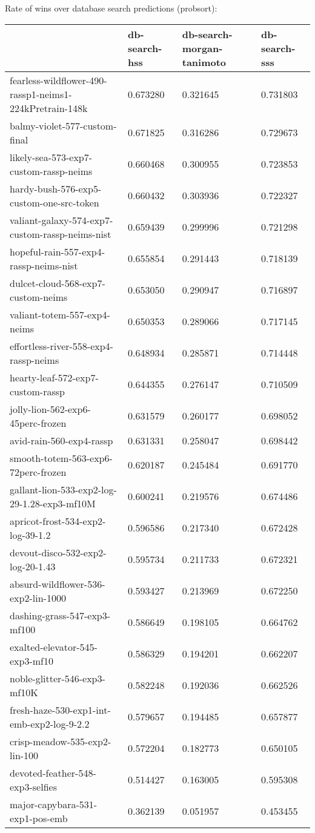 Rate of wins over database search predictions (probsort):
\begin{tabular}{llll}
\toprule
 & db-search-hss & db-search-morgan-tanimoto & db-search-sss \\
\midrule
fearless-wildflower-490-rassp1-neims1-224kPretrain-148k & 0.673280 & 0.321645 & 0.731803 \\
balmy-violet-577-custom-final & 0.671825 & 0.316286 & 0.729673 \\
likely-sea-573-exp7-custom-rassp-neims & 0.660468 & 0.300955 & 0.723853 \\
hardy-bush-576-exp5-custom-one-src-token & 0.660432 & 0.303936 & 0.722327 \\
valiant-galaxy-574-exp7-custom-rassp-neims-nist & 0.659439 & 0.299996 & 0.721298 \\
hopeful-rain-557-exp4-rassp-neims-nist & 0.655854 & 0.291443 & 0.718139 \\
dulcet-cloud-568-exp7-custom-neims & 0.653050 & 0.290947 & 0.716897 \\
valiant-totem-557-exp4-neims & 0.650353 & 0.289066 & 0.717145 \\
effortless-river-558-exp4-rassp-neims & 0.648934 & 0.285871 & 0.714448 \\
hearty-leaf-572-exp7-custom-rassp & 0.644355 & 0.276147 & 0.710509 \\
jolly-lion-562-exp6-45perc-frozen & 0.631579 & 0.260177 & 0.698052 \\
avid-rain-560-exp4-rassp & 0.631331 & 0.258047 & 0.698442 \\
smooth-totem-563-exp6-72perc-frozen & 0.620187 & 0.245484 & 0.691770 \\
gallant-lion-533-exp2-log-29-1.28-exp3-mf10M & 0.600241 & 0.219576 & 0.674486 \\
apricot-frost-534-exp2-log-39-1.2 & 0.596586 & 0.217340 & 0.672428 \\
devout-disco-532-exp2-log-20-1.43 & 0.595734 & 0.211733 & 0.672321 \\
absurd-wildflower-536-exp2-lin-1000 & 0.593427 & 0.213969 & 0.672250 \\
dashing-grass-547-exp3-mf100 & 0.586649 & 0.198105 & 0.664762 \\
exalted-elevator-545-exp3-mf10 & 0.586329 & 0.194201 & 0.662207 \\
noble-glitter-546-exp3-mf10K & 0.582248 & 0.192036 & 0.662526 \\
fresh-haze-530-exp1-int-emb-exp2-log-9-2.2 & 0.579657 & 0.194485 & 0.657877 \\
crisp-meadow-535-exp2-lin-100 & 0.572204 & 0.182773 & 0.650105 \\
devoted-feather-548-exp3-selfies & 0.514427 & 0.163005 & 0.595308 \\
major-capybara-531-exp1-pos-emb & 0.362139 & 0.051957 & 0.453455 \\
\bottomrule
\end{tabular}



